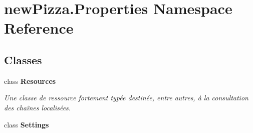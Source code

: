 \hypertarget{namespacenewPizza_1_1Properties}{}\section{new\+Pizza.\+Properties Namespace Reference}
\label{namespacenewPizza_1_1Properties}
\subsection*{Classes}
\begin{DoxyCompactItemize}
\item 
class {\bfseries Resources}
\begin{DoxyCompactList}\small\item\em Une classe de ressource fortement typée destinée, entre autres, à la consultation des chaînes localisées. \end{DoxyCompactList}\item 
class {\bfseries Settings}
\end{DoxyCompactItemize}
